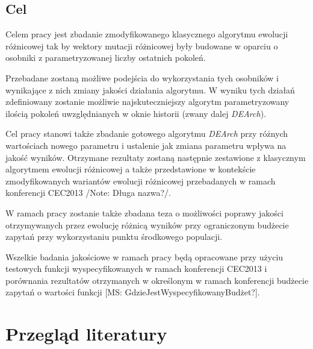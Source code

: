 \documentclass[11pt,a4paper]{report}
\begin{document}
{\section{Cel}
\par{
Celem pracy jest zbadanie zmodyfikowanego klasycznego algorytmu ewolucji różnicowej \cite{RainerStorn} tak by wektory mutacji różnicowej były budowane w oparciu o osobniki z parametryzowanej liczby ostatnich pokoleń.
}
\par{
Przebadane zostaną możliwe podejścia do wykorzystania tych osobników i wynikające z nich zmiany jakości działania algorytmu. W wyniku tych działań zdefiniowany zostanie możliwie najskuteczniejszy algorytm parametryzowany ilością pokoleń uwzględnianych w oknie historii (zwany dalej \emph{DEArch}).
}
\par{
Cel pracy stanowi także zbadanie gotowego algorytmu \emph{DEArch} przy różnych wartościach nowego parametru i ustalenie jak zmiana parametru wpływa na jakość wyników. Otrzymane rezultaty zostaną następnie zestawione z klasycznym algorytmem ewolucji różnicowej a także przedstawione w kontekście zmodyfikowanych wariantów ewolucji różnicowej przebadanych w ramach konferencji CEC2013 /Note: Długa nazwa?/.
}
\par{
W ramach pracy zostanie także zbadana teza o możliwości poprawy jakości otrzymywanych przez ewolucję różnicą wyników przy ograniczonym budżecie zapytań przy wykorzystaniu punktu środkowego populacji.
}
\par{
Wszelkie badania jakościowe w ramach pracy będą opracowane przy użyciu testowych funkcji wyspecyfikowanych w ramach konferencji CEC2013 i porównania rezultatów otrzymanych w określonym w ramach konferencji budżecie zapytań o wartości funkcji [MS: GdzieJestWyspecyfikowanyBudżet?].
}

\chapter{Przegląd literatury}
}
\end{document}
